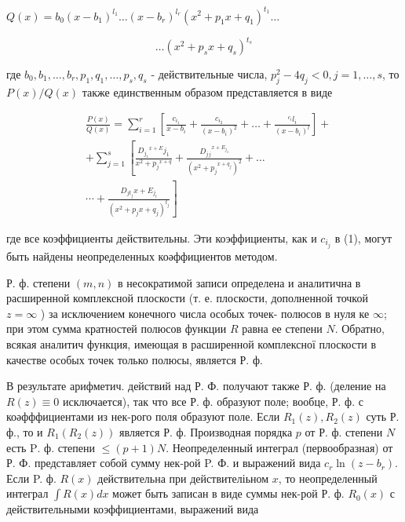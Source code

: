 \documentclass[10pt]{article}
\begin{document}
$Q(x)=b_{0}\left(x-b_{1}\right)^{l_{1}} \ldots\left(x-b_{r}\right)^{l_{r}}\left(x^{2}+p_{1} x+q_{1}\right)^{t_{1}} \ldots$



\[

\ldots\left(x^{2}+p_{s} x+q_{s}\right)^{t_{s}}

\]



где $b_{0}, b_{1}, \ldots, b_{r}, p_{1}, q_{1}, \ldots, p_{s}, q_{s}$ - действительные числа, $p_{j}^{2}-4 q_{j}<0, j=1, \ldots, s$, то $P(x) / Q(x)$ также единственным образом представляется в виде



\[

\begin{aligned}

& \frac{P(x)}{Q(x)}=\sum_{i=1}^{r}\left[\frac{c_{i_{1}}}{x-b_{i}}+\frac{c_{i_{2}}}{\left(x-b_{i}\right)^{2}}+\ldots+\frac{{ }^{c_{i}} l_{i}}{\left(x-b_{i}\right)^{l}}\right]+ \\

& +\sum_{j=1}^{s}\left[\frac{D_{j_{1}}{ }^{x+E} j_{1}}{x^{2}+p_{j}{ }^{x+q}}+\frac{D_{j}{ }_{j}{ }^{x+E_{j_{2}}}}{\left(x^{2}+p_{j}{ }^{x+q_{j}}\right)^{2}}+\ldots\right. \\

& \left.\cdots+\frac{D_{j t_{j}} x+E_{j_{t}}}{\left(x^{2}+p_{j} x+q_{j}\right)^{t_{j}}}\right]

\end{aligned}

\]



где все коэффициенты действительны. Эти коэффициенты, как и $c_{i_{j}}$ в (1), могут быть найдены неопределенных коәффициентов методом.



Р. ф. степени $(m, n)$ в несократимой записи определена и аналитична в расширенной комплексной плоскости (т. е. плоскости, дополненной точкой $z=\infty$ ) за исключением конечного числа особых точек- полюсов в нуля ке $\infty$; при этом сумма кратностей полюсов функции $R$ равна ее степени $N$. Обратно, всякая аналитич функция, имеющая в расширенной комплексної плоскости в качестве особых точек только полюсы, является Р. ф.



В результате арифметич. действий над Р. Ф. получают также Р. ф. (деление на $R(z) \equiv 0$ исключается), так что все Р. ф. образуют поле; вообце, Р. ф. с коәфффициентами из нек-рого поля образуют поле. Если $R_{1}(z), R_{2}(z)$ суть Р. ф., то и $R_{1}\left(R_{2}(z)\right)$ является Р. ф. Производная порядка $p$ от Р. ф. степени $N$ есть $\mathrm{P}$. $ф$. степени $\leqslant(p+1) N$. Неопределенный интеграл (первообразная) от Р. Ф. представляет собой сумму нек-рой P. Ф. и выражений вида $c_{r} \ln \left(z-b_{r}\right)$. Если P. ф. $R(x)$ действительна при действителіьном $x$, то неопределенный интеграл $\int R(x) d x$ может быть записан в виде суммы нек-рой Р. ф. $R_{0}(x)$ с действительными коэффициентами, выражений вида
\end{document}
